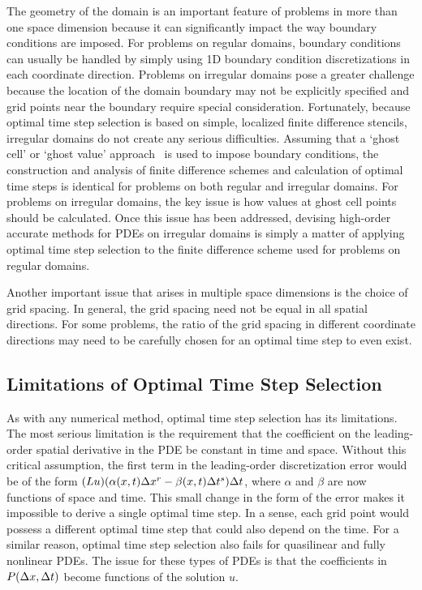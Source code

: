 \documentclass[oneeqnum,onefignum,onetabnum,onethmnum]{siamltex}
\begin{document}
The geometry of the domain is an important feature of problems in more than 
one space dimension because it can significantly impact the way boundary 
conditions are imposed.  For problems on regular domains, boundary conditions 
can usually be handled by simply using 1D boundary condition discretizations 
in each coordinate direction.  Problems on irregular domains pose a greater 
challenge because the location of the domain boundary may not be explicitly 
specified and grid points near the boundary require special consideration.  
Fortunately, because optimal time step selection is based on simple, localized 
finite difference stencils, irregular domains do not create any serious 
difficulties.  Assuming that a `ghost cell' or `ghost value' 
approach~\cite{gibou_2005, fedkiw_1999, osher_fedkiw_book} is used to impose 
boundary conditions, the construction and analysis of finite 
difference schemes and calculation of optimal time steps is identical for 
problems on both regular and irregular domains.  For problems on 
irregular domains, the key issue is how values at ghost cell points should 
be calculated.  Once this issue has been addressed, devising high-order 
accurate methods for PDEs on irregular domains is simply a matter of applying 
optimal time step selection to the finite difference scheme used for problems 
on regular domains. 

Another important issue that arises in multiple space dimensions is the choice
of grid spacing.  In general, the grid spacing need not be equal in all 
spatial directions.  For some problems, the ratio of the grid spacing in
different coordinate directions may need to be carefully chosen for an 
optimal time step to even exist.


\subsection{Limitations of Optimal Time Step Selection}
As with any numerical method, optimal time step selection has its limitations.
The most serious limitation is the requirement that the coefficient on the 
leading-order spatial derivative in the PDE be constant in time and space.  
Without this critical assumption, the first term in the leading-order 
discretization error would be of the form 
$(L u) (\alpha(x,t) \Delta x^r - \beta(x,t) \Delta t^s) \Delta t$,
where $\alpha$ and $\beta$ are now functions of space and time.  This
small change in the form of the error makes it impossible to derive a single 
optimal time step.  In a sense, each grid point would possess a different 
optimal time step that could also depend on the time.  For a similar reason, 
optimal time step selection also fails for quasilinear and fully nonlinear 
PDEs.  The issue for these types of PDEs is that the coefficients in 
$P(\Delta x, \Delta t)$ become functions of the solution $u$.
\end{document}
